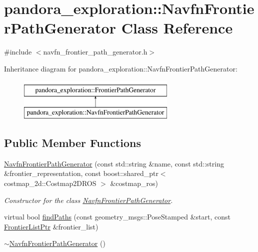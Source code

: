 \hypertarget{classpandora__exploration_1_1_navfn_frontier_path_generator}{\section{pandora\-\_\-exploration\-:\-:\-Navfn\-Frontier\-Path\-Generator \-Class \-Reference}
\label{classpandora__exploration_1_1_navfn_frontier_path_generator}
}


{\ttfamily \#include $<$navfn\-\_\-frontier\-\_\-path\-\_\-generator.\-h$>$}

\-Inheritance diagram for pandora\-\_\-exploration\-:\-:\-Navfn\-Frontier\-Path\-Generator\-:\begin{figure}[H]
\begin{center}
\leavevmode
\includegraphics[height=2.000000cm]{classpandora__exploration_1_1_navfn_frontier_path_generator}
\end{center}
\end{figure}
\subsection*{\-Public \-Member \-Functions}
\begin{DoxyCompactItemize}
\item 
\hyperlink{classpandora__exploration_1_1_navfn_frontier_path_generator_a0e901e7e1a3783d1a98d6c5b70f97c98}{\-Navfn\-Frontier\-Path\-Generator} (const std\-::string \&name, const std\-::string \&frontier\-\_\-representation, const boost\-::shared\-\_\-ptr$<$ costmap\-\_\-2d\-::\-Costmap2\-D\-R\-O\-S $>$ \&costmap\-\_\-ros)
\begin{DoxyCompactList}\small\item\em \-Constructor for the class \hyperlink{classpandora__exploration_1_1_navfn_frontier_path_generator}{\-Navfn\-Frontier\-Path\-Generator}. \end{DoxyCompactList}\item 
virtual bool \hyperlink{classpandora__exploration_1_1_navfn_frontier_path_generator_a663edd4bc478458e1c5176a81422a51d}{find\-Paths} (const geometry\-\_\-msgs\-::\-Pose\-Stamped \&start, const \hyperlink{namespacepandora__exploration_a6f3b1959fca391e2ef3ac46b6e96be7a}{\-Frontier\-List\-Ptr} \&frontier\-\_\-list)
\item 
\hyperlink{classpandora__exploration_1_1_navfn_frontier_path_generator_afec25a595521fc29a416c78b196a1699}{$\sim$\-Navfn\-Frontier\-Path\-Generator} ()
\end{DoxyCompactItemize}


